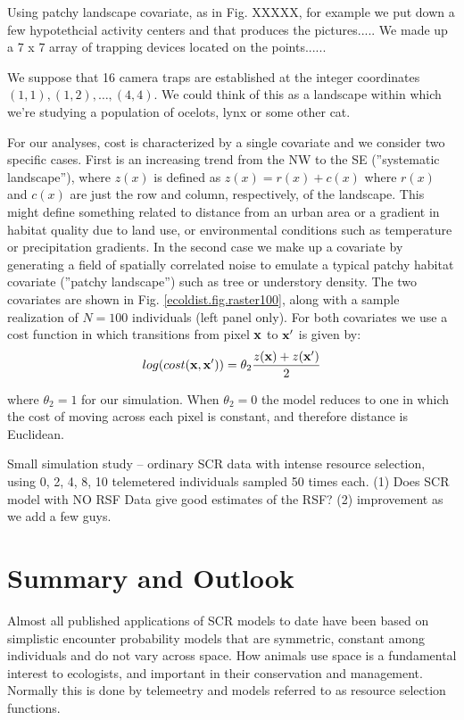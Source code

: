 Using patchy landscape covariate, as in Fig. XXXXX, for example we put
down a few hypotethcial activity centers and that produces the pictures.....
We made up a 7 x 7 array of trapping devices located on the points......

We suppose that 16 camera traps are established at the integer coordinates
$(1,1), (1,2), \ldots, (4,4)$. We could think of this as a landscape
within which we're studying a population of ocelots, lynx or some
other cat.

For our analyses, cost is characterized by a single covariate
and we consider two specific cases. First is an increasing trend from
the NW to the SE (''systematic landscape''), where $z(x)$ is defined as
$z(x) = r(x) + c(x)$ where $r(x)$ and $c(x)$ are just the row and
column, respectively, of the landscape.  This might define something
related to distance from an urban area or a gradient in habitat
quality due to land use, or environmental conditions such as
temperature or precipitation gradients.  In the second case we make up
a covariate by generating a field of spatially correlated noise to
emulate a typical patchy habitat covariate (''patchy landscape'') such as
tree or understory density. The two covariates are shown in
Fig. \ref{ecoldist.fig.raster100}, along with a sample realization of
$N=100$ individuals (left panel only).  For both covariates we use a
cost function in which transitions from pixel ${\bf x}$ to ${\bf x}'$
is given by:
\[
 log(cost({\bf x},{\bf x}'))=  \theta_2 \frac{z({\bf x}) + z({\bf x}')}{2}
\]

{\flushleft where} $\theta_2 = 1$ for our simulation.
When $\theta_2=0$ the
model reduces to one in which the cost of moving across each pixel is
constant, and therefore distance is Euclidean.

Small simulation study -- ordinary SCR data with intense resource selection,
using 0, 2, 4, 8, 10 telemetered individuals sampled 50 times each.
(1) Does SCR model with NO RSF Data give good estimates of the RSF?
(2) improvement as we add a few guys.


\section{Summary and Outlook}


Almost
all published applications of SCR models to date have been based on
simplistic encounter probability models that are symmetric, constant among
individuals and  do not vary across space. How animals use space is a
fundamental interest to ecologists, and important in their
conservation and management. Normally this is done by telemeetry and
models referred to as resource selection functions.

